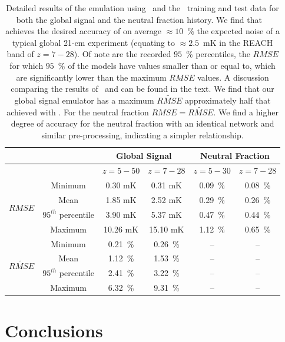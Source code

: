 \begin{table}
    \centering
    \begin{tabular}{|c|c|c|c|c|c|}
        \hline
         & & \multicolumn{2}{|c|}{Global Signal} & \multicolumn{2}{|c|}{Neutral Fraction} \\
         \hline
         & & $z = 5- 50$& $z = 7- 28$& $z = 5- 30$& $z = 7- 28$ \\
         \hline
         \multirow{4}{4em}{$RMSE$}& Minimum &  0.30 mK &  0.31 mK& 0.09~\% & 0.08~\% \\
         & Mean & 1.85 mK& 2.52 mK& 0.29~\% & 0.26~\% \\
         & $95^{th}$ percentile& 3.90 mK& 5.37 mK& 0.47~\%& 0.44~\%\\
         & Maximum & 10.26 mK& 15.10 mK& 1.12~\% & 0.65~\% \\
         \hline
         \multirow{4}{4em}{$\widetilde{RMSE}$}& Minimum & 0.21~\% & 0.26~\%& -- & -- \\
         & Mean & 1.12~\% & 1.53~\% & -- & -- \\
         & $95^{th}$ percentile& 2.41~\% & 3.22~\% & -- & -- \\
         & Maximum & 6.32~\% & 9.31~\% & -- & -- \\
         \hline
    \end{tabular}
    \caption{Detailed results of the emulation using \name~and the \cmGEM~training and test data for both the global signal and the neutral fraction history. We find that \name~ achieves the desired accuracy of on average $\approx 10$~\% the expected noise of a typical global 21-cm experiment (equating to $\approx 2.5$~mK in the REACH band of $z=7-28$). Of note are the recorded $95$~\% percentiles, the $RMSE$ for which $95$~\% of the models have values smaller than or equal to, which are significantly lower than the maximum $RMSE$ values. A discussion comparing the results of \cmGEM~and \name can be found in the text. We find that our global signal emulator has a maximum $\widetilde{RMSE}$ approximately half that achieved with \cmGEM. For the neutral fraction $RMSE = \widetilde{RMSE}$. We find a higher degree of accuracy for the neutral fraction with an identical network and similar pre-processing, indicating a simpler relationship.}
    \label{tab:full_results}
\end{table}

\section{Conclusions}
\label{sec:globalemu_conclusions}


